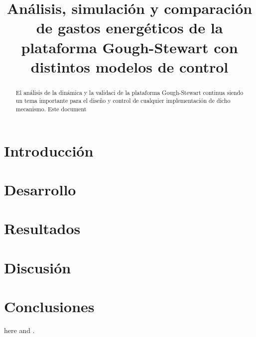 \documentclass[article]{IEEEtran}
\begin{document}
\title{
Análisis, simulación y comparación de gastos energéticos de la plataforma Gough-Stewart con distintos modelos de control\\
}


\author{
}

\maketitle

\begin{abstract}
El análisis de la dinámica y la validaci de la plataforma Gough-Stewart 
continua siendo un tema importante para el diseño y control de cualquier implementación de dicho mecanismo.
Este document

\end{abstract}


\section{Introducción}


\section{Desarrollo}


\section{Resultados}


\section{Discusión}


\section{Conclusiones}


here \cite{bingul} and \cite{leonov}.



\end{document}
